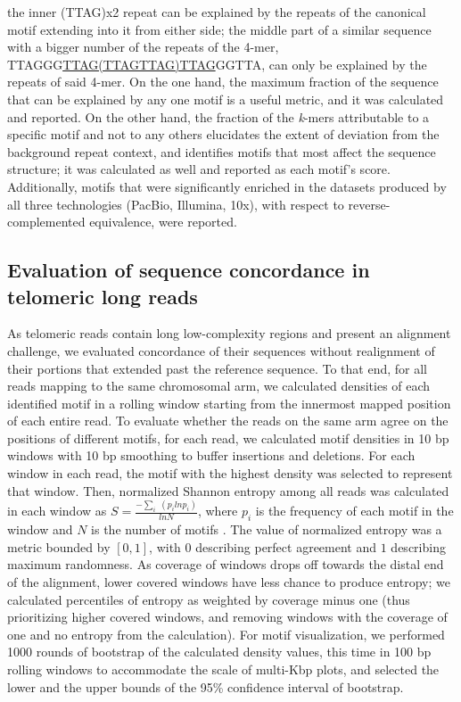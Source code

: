 \documentclass{article}
\begin{document}
            the inner (TTAG)x2 repeat can be explained by the repeats of the canonical motif extending into it from either side;
            the middle part of a similar sequence with a bigger number of the repeats of the 4-mer, TTAGGG\underline{TTAG(TTAGTTAG)TTAG}GGTTA,
                can only be explained by the repeats of said 4-mer.
        On the one hand, the maximum fraction of the sequence that can be explained by any one motif is a useful metric,
            and it was calculated and reported.
        On the other hand, the fraction of the \textit{k}-mers attributable to a specific motif \textendash{} and not to any others \textendash{}
            elucidates the extent of deviation from the background repeat context,
            and identifies motifs that most affect the sequence structure;
            it was calculated as well and reported as each motif's score.
    Additionally, motifs that were significantly enriched in the datasets produced by all three technologies (PacBio, Illumina, 10x),
        with respect to reverse-complemented equivalence, were reported.

\subsection*{Evaluation of sequence concordance in telomeric long reads}
    As telomeric reads contain long low-complexity regions and present an alignment challenge,
        we evaluated concordance of their sequences without realignment of their portions that extended past the reference sequence.
    To that end, for all reads mapping to the same chromosomal arm,
        we calculated densities of each identified motif in a rolling window starting from the innermost mapped position of each entire read.
    To evaluate whether the reads on the same arm agree on the positions of different motifs,
        for each read, we calculated motif densities in 10 bp windows with 10 bp smoothing to buffer insertions and deletions.
    For each window in each read,
        the motif with the highest density was selected to represent that window.
    Then, normalized Shannon entropy among all reads was calculated in each window as $ S = \frac{ - \sum_{i} \; ( p_{i} ln p_{i} )}{ln N} $,
        where $ p_{i} $ is the frequency of each motif in the window and $ N $ is the number of motifs \parencite{hepc_entropy}.
    The value of normalized entropy was a metric bounded by $ [ 0, 1 ] $,
        with $ 0 $ describing perfect agreement and $ 1 $ describing maximum randomness.
    As coverage of windows drops off towards the distal end of the alignment,
        lower covered windows have less chance to produce entropy;
        we calculated percentiles of entropy as weighted by coverage minus one
        (thus prioritizing higher covered windows, and removing windows with the coverage of one and no entropy from the calculation).
    For motif visualization,
        we performed 1000 rounds of bootstrap of the calculated density values,
            this time in 100 bp rolling windows to accommodate the scale of multi-Kbp plots,
            and selected the lower and the upper bounds of the 95\% confidence interval of bootstrap.
\end{document}
